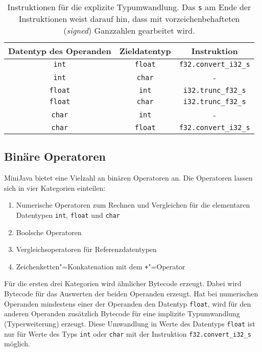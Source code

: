 \begin{table}
    \centering
    \begin{tabular}{| c | c | c |}
        \hline
        Datentyp des Operanden & Zieldatentyp & Instruktion \\
        \hline
        {\lstinline!int!} & {\lstinline!float!} & {\lstinline!f32.convert_i32_s!} \\
        {\lstinline!int!} & {\lstinline!char!} & - \\
        {\lstinline!float!} & {\lstinline!int!} & {\lstinline!i32.trunc_f32_s!} \\
        {\lstinline!float!} & {\lstinline!char!} & {\lstinline!i32.trunc_f32_s!} \\
        {\lstinline!char!} & {\lstinline!int!} & - \\
        {\lstinline!char!} & {\lstinline!float!} & {\lstinline!f32.convert_i32_s!} \\
        \hline
    \end{tabular}
    \caption{Instruktionen für die explizite Typumwandlung. Das \lstinline{s} am Ende der Instruktionen weist darauf hin, dass mit vorzeichenbehafteten (\emph{signed}) Ganzzahlen gearbeitet wird.}
    \label{tab:castOperators}
\end{table}



\subsection{Binäre Operatoren}

MiniJava bietet eine Vielzahl an binären Operatoren an. Die Operatoren lassen sich in vier Kategorien einteilen:
\begin{enumerate}
    \item Numerische Operatoren zum Rechnen und Vergleichen für die elementaren Datentypen \lstinline{int}, \lstinline{float} und \lstinline{char}
    \item Boolsche Operatoren
    \item Vergleichsoperatoren für Referenzdatentypen
    \item Zeichenketten"=Konkatenation mit dem \lstinline{+}"=Operator
\end{enumerate}

Für die ersten drei Kategorien wird ähnlicher Bytecode erzeugt. Dabei wird Bytecode für das Auswerten der beiden Operanden erzeugt. Hat bei numerischen Operanden mindestens einer der Operanden den Datentyp \lstinline{float}, wird für den anderen Operanden zusätzlich Bytecode für eine implizite Typumwandlung (Typerweiterung) erzeugt. Diese Umwandlung in Werte des Datentyps \lstinline{float} ist nur für Werte des Typs \lstinline{int} oder \lstinline{char} mit der Instruktion \lstinline{f32.convert_i32_s} möglich.

